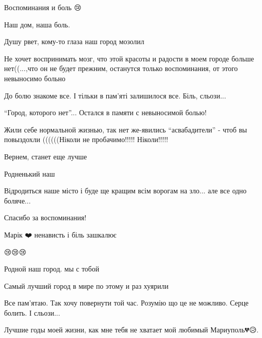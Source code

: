 
Воспоминания и боль 😢


Наш дом, наша боль.


Душу рвет, кому-то глаза наш город мозолил🤔


Не хочет воспринимать мозг, что этой красоты и радости в моем городе больше
нет((...,что он не будет прежним, останутся только воспоминания, от этого
невыносимо больно


До болю знакоме все. І тільки в пам'яті залишилося все. Біль, сльози...


\enquote{Город, которого нет}... Остался в памяти с невыносимой болью!


Жили себе нормальной жизнью, так нет же-явились \enquote{асвабадители} - чтоб вы
повыздохли ((((((Ніколи не пробачимо!!!!! Ніколи!!!!!


Вернем, станет еще лучше


Родненький наш


Відродиться наше місто і буде ще кращим всім ворогам на зло... але все одно
боляче...


Спасибо за воспоминания!💖💖💖


Марік ❤️ ненависть і біль зашкалює

😢😢😢


Родной наш город. мы с тобой


Самый лучший город в мире по этому и раз хуярили


Все пам'ятаю. Так хочу повернути той час. Розумію що це не можливо. Серце болить. І сльози...


Лучшие годы моей жизни, как мне тебя не хватает мой любимый Мариуполь💔😥.

